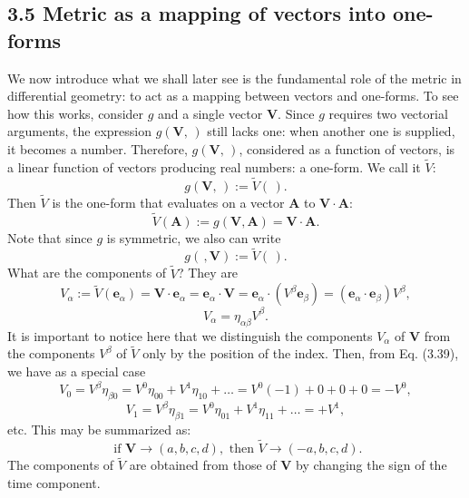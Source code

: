 \documentclass[12pt]{book}
\begin{document}
    \subsection{3.5 Metric as a mapping of vectors into one-forms}
    We now introduce what we shall later see is the fundamental role of the metric in differential geometry: to act as a mapping between vectors and one-forms. To see how this works, consider \(g\) and a single vector \(\mathbf{V}\). Since \(g\) requires two vectorial arguments, the expression \(g(\mathbf{V}, \,)\) still lacks one: when another one is supplied, it becomes a number. Therefore, \(g(\mathbf{V}, \,)\), considered as a function of vectors, is a linear function of vectors producing real numbers: a one-form. We call it \(\tilde{V}\):
    \[
    g(\mathbf{V}, \,) := \tilde{V}( \,). \tag{3.37}
    \]
    Then \(\tilde{V}\) is the one-form that evaluates on a vector \(\mathbf{A}\) to \(\mathbf{V} \cdot \mathbf{A}\):
    \[
    \tilde{V}(\mathbf{A}) := g(\mathbf{V},\mathbf{A}) = \mathbf{V} \cdot \mathbf{A}. \tag{3.38}
    \]
    Note that since \(g\) is symmetric, we also can write
    \[
    g( \,, \mathbf{V}) := \tilde{V}( \,).
    \]
    What are the components of \(\tilde{V}\)? They are
    \[
    V_\alpha := \tilde{V}(\mathbf{e}_\alpha) = \mathbf{V} \cdot \mathbf{e}_\alpha = \mathbf{e}_\alpha \cdot \mathbf{V}
    = \mathbf{e}_\alpha \cdot (V^\beta \mathbf{e}_\beta)
    = (\mathbf{e}_\alpha \cdot \mathbf{e}_\beta)V^\beta,
    \]
    \[
    V_\alpha = \eta_{\alpha\beta}V^\beta. \tag{3.39}
    \]
    It is important to notice here that we distinguish the components \(V_\alpha\) of \(\mathbf{V}\) from the components \(V^\beta\) of \(\tilde{V}\) only by the position of the index. Then, from Eq. (3.39), we have as a special case
    \[
    V_0 = V^\beta \eta_{\beta 0} = V^0 \eta_{00} + V^1 \eta_{10} + \dots 
    = V^0(-1) + 0 + 0 + 0 
    = -V^0, \tag{3.40}
    \]
    \[
    V_1 = V^\beta \eta_{\beta 1} = V^0 \eta_{01} + V^1 \eta_{11} + \dots 
    = +V^1, \tag{3.41}
    \]
    etc. This may be summarized as: 
    \[
    \text{ if } \mathbf{V} \rightarrow (a, b, c, d),
    \text{ then } \tilde{V} \rightarrow (-a, b, c, d). \tag{3.42}
    \]
    The components of \(\tilde{V}\) are obtained from those of \(\mathbf{V}\) by changing the sign of the time component. 
    
\end{document}

